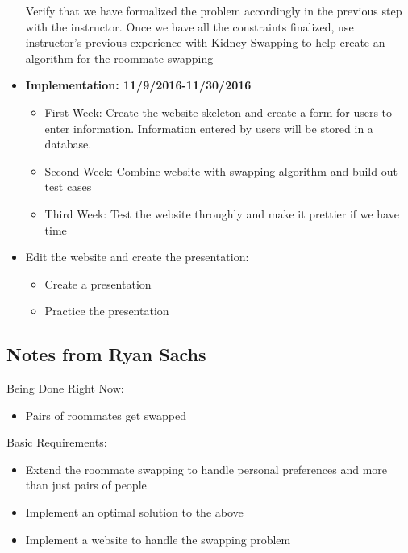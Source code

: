 \documentclass[12pt]{article}
\begin{document}
\begin{itemize}
Verify that we have formalized the problem accordingly in the previous step with the instructor. Once we have all the constraints finalized, use instructor's previous experience with Kidney Swapping to help create an algorithm for the roommate swapping
\item \textbf{Implementation: 11/9/2016-11/30/2016} 
\begin{itemize}
\item First Week: Create the website skeleton and create a form for users to enter information. Information entered by users will be stored in a database. 
\item Second Week: Combine website with swapping algorithm and build out test cases
\item Third Week: Test the website throughly and make it prettier if we have time
\end{itemize}
\item Edit the website and create the presentation: 
\begin{itemize} 
\item Create a presentation
\item Practice the presentation
\end{itemize}

\end{itemize}


\subsection*{Notes from Ryan Sachs}

Being Done Right Now:
\begin{itemize}
\item Pairs of roommates get swapped
\end{itemize}

Basic Requirements:
\begin{itemize}
\item Extend the roommate swapping to handle personal preferences and more than just pairs of people
\item Implement an optimal solution to the above
\item Implement a website to handle the swapping problem
\end{itemize}
\end{document}

